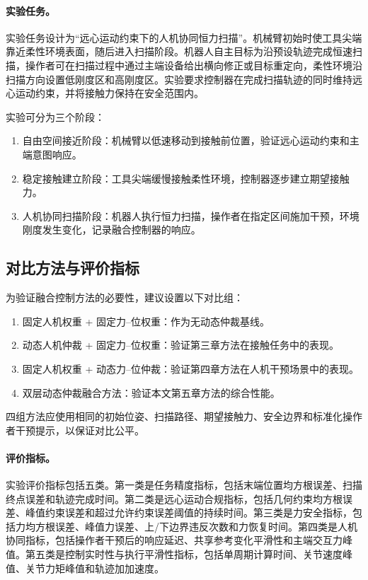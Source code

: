 \paragraph{实验任务。}
\label{subsec:ch5_task}

实验任务设计为“远心运动约束下的人机协同恒力扫描”。机械臂初始时使工具尖端靠近柔性环境表面，随后进入扫描阶段。机器人自主目标为沿预设轨迹完成恒速扫描，操作者可在扫描过程中通过主端设备给出横向修正或目标重定向，柔性环境沿扫描方向设置低刚度区和高刚度区。实验要求控制器在完成扫描轨迹的同时维持远心运动约束，并将接触力保持在安全范围内。

实验可分为三个阶段：
\begin{enumerate}
  \item 自由空间接近阶段：机械臂以低速移动到接触前位置，验证远心运动约束和主端意图响应。
  \item 稳定接触建立阶段：工具尖端缓慢接触柔性环境，控制器逐步建立期望接触力。
  \item 人机协同扫描阶段：机器人执行恒力扫描，操作者在指定区间施加干预，环境刚度发生变化，记录融合控制器的响应。
\end{enumerate}

\subsection{对比方法与评价指标}
\label{subsec:ch5_compare_methods}

为验证融合控制方法的必要性，建议设置以下对比组：
\begin{enumerate}
  \item 固定人机权重 + 固定力--位权重：作为无动态仲裁基线。
  \item 动态人机仲裁 + 固定力--位权重：验证第三章方法在接触任务中的表现。
  \item 固定人机权重 + 动态力--位仲裁：验证第四章方法在人机干预场景中的表现。
  \item 双层动态仲裁融合方法：验证本文第五章方法的综合性能。
\end{enumerate}
四组方法应使用相同的初始位姿、扫描路径、期望接触力、安全边界和标准化操作者干预提示，以保证对比公平。

\paragraph{评价指标。}
\label{subsec:ch5_metrics}

实验评价指标包括五类。第一类是任务精度指标，包括末端位置均方根误差、扫描终点误差和轨迹完成时间。第二类是远心运动合规指标，包括几何约束均方根误差、峰值约束误差和超过允许约束误差阈值的持续时间。第三类是力安全指标，包括力均方根误差、峰值力误差、上/下边界违反次数和力恢复时间。第四类是人机协同指标，包括操作者干预后的响应延迟、共享参考变化平滑性和主端交互力峰值。第五类是控制实时性与执行平滑性指标，包括单周期计算时间、关节速度峰值、关节力矩峰值和轨迹加加速度。


